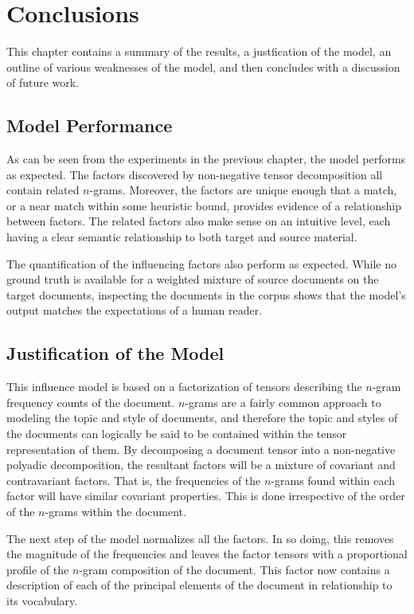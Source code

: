 \documentclass[../ut-dissertation.tex]{subfiles}
\begin{document}
\chapter{Conclusions}
This chapter contains a summary of the results, a justfication of the
model, an outline of various weaknesses of the model, and then
concludes with a discussion of future work.

\section{Model Performance}
As can be seen from the experiments in the previous chapter, the model
performs as expected.  The factors discovered by non-negative tensor
decomposition all contain related $n$-grams.  Moreover, the factors
are unique enough that a match, or a near match within some heuristic
bound, provides evidence of a relationship between factors.  The
related factors also make sense on an intuitive level, each having a
clear semantic relationship to both target and source material.

The quantification of the influencing factors also perform as
expected.  While no ground truth is available for a weighted mixture
of source documents on the target documents, inspecting the documents
in the corpus shows that the model's output matches the expectations
of a human reader.  


\section{Justification of the Model}
This influence model is based on a factorization of tensors describing
the $n$-gram frequency counts of the document.  $n$-grams are a fairly
common approach to modeling the topic and style of documents, and
therefore the topic and styles of the documents can logically be said
to be contained within the tensor representation of them.  By
decomposing a document tensor into a non-negative polyadic
decomposition, the resultant factors will be a mixture of covariant
and contravariant factors.  That is, the frequencies of the $n$-grams
found within each factor will have similar covariant properties.  This
is done irrespective of the order of the $n$-grams within the
document.

The next step of the model normalizes all the factors.  In so doing,
this removes the magnitude of the frequencies and leaves the factor
tensors with a proportional profile of the $n$-gram composition of the
document.  This factor now contains a description of each of the
principal elements of the document in relationship to its vocabulary.
\end{document}
